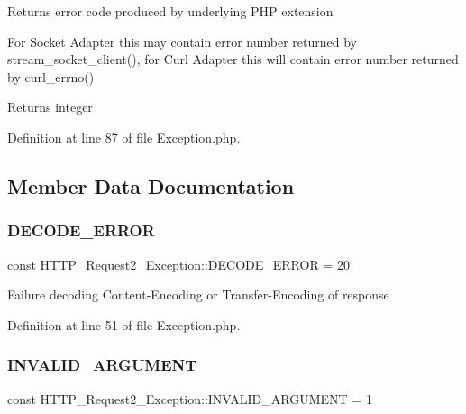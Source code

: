 Returns error code produced by underlying P\+HP extension

For Socket Adapter this may contain error number returned by stream\+\_\+socket\+\_\+client(), for Curl Adapter this will contain error number returned by curl\+\_\+errno()

\begin{DoxyReturn}{Returns}
integer 
\end{DoxyReturn}


Definition at line 87 of file Exception.\+php.



\subsection{Member Data Documentation}
\mbox{\label{classHTTP__Request2__Exception_aa993bf6ecf3372cd4fd011492d3d0cbc}} 
\subsubsection{\texorpdfstring{D\+E\+C\+O\+D\+E\+\_\+\+E\+R\+R\+OR}{DECODE\_ERROR}}
{\footnotesize\ttfamily const H\+T\+T\+P\+\_\+\+Request2\+\_\+\+Exception\+::\+D\+E\+C\+O\+D\+E\+\_\+\+E\+R\+R\+OR = 20}

Failure decoding Content-\/\+Encoding or Transfer-\/\+Encoding of response 

Definition at line 51 of file Exception.\+php.

\mbox{\label{classHTTP__Request2__Exception_ac3d68c3ce21b962862d90ed021dd037d}} 
\subsubsection{\texorpdfstring{I\+N\+V\+A\+L\+I\+D\+\_\+\+A\+R\+G\+U\+M\+E\+NT}{INVALID\_ARGUMENT}}
{\footnotesize\ttfamily const H\+T\+T\+P\+\_\+\+Request2\+\_\+\+Exception\+::\+I\+N\+V\+A\+L\+I\+D\+\_\+\+A\+R\+G\+U\+M\+E\+NT = 1}

